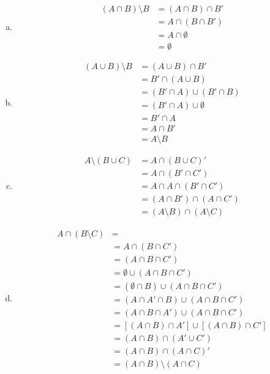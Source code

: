\begin{enumerate}[(a)]
\item
\begin{align*}
(A\cap B) \setminus B & =(A\cap B)\cap B'\\
& = A\cap (B\cap B')\\
& = A\cap \emptyset\\
& = \emptyset
\end{align*}

\item
\begin{align*}
(A\cup B) \setminus B & =(A\cup B)\cap B'\\
& = B'\cap (A\cup B)\\
& = (B'\cap A)\cup(B'\cap B)\\
& = (B'\cap A)\cup \emptyset\\
& = B'\cap A\\
& = A\cap B'\\
& = A\setminus B
\end{align*}

\item
\begin{align*}
A\setminus (B\cup C) & =A\cap (B\cup C)'\\
& = A\cap (B'\cap C')\\
& = A\cap A\cap(B'\cap C')\\
& = (A\cap B')\cap (A\cap C')\\
& = (A\setminus B)\cap (A\setminus C)
\end{align*}

\item
\begin{align*}
A \cap (B \setminus C) &= \\
&= A \cap (B \cap C')\\
&= (A \cap B \cap C')\\
&= \emptyset \cup (A \cap B \cap C')\\
&= (\emptyset \cap B) \cup (A \cap B \cap C')\\
&= (A \cap A' \cap B) \cup (A \cap B \cap C')\\
&= (A \cap B \cap A') \cup (A \cap B \cap C')\\
&= [(A \cap B) \cap A'] \cup [(A \cap B) \cap C']\\
&= (A \cap B) \cap (A' \cup C')\\
&= (A \cap B) \cap (A \cap C)'\\
&= (A \cap B) \setminus (A \cap C)
\end{align*}


\end{enumerate}
